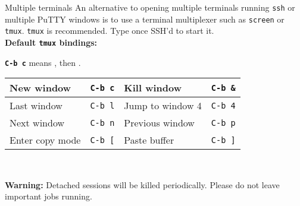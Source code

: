 \begin{block}{Multiple terminals}
  An alternative to opening multiple terminals running \texttt{ssh} or multiple PuTTY windows is to use a terminal multiplexer such as \texttt{screen} or \texttt{tmux}. \texttt{tmux} is recommended. Type  once SSH'd to start it. \\[0.7em]
  \textbf{Default \texttt{tmux} bindings:} \\
  {\newcommand{\key}[1]{\texttt{C-b #1}}
    \textbf{\key{c}} means , then .
    \begin{tabu} to 0.9\linewidth { X[2] X X[2] X }
      \hline
      New window & \key{c} & Kill window & \key{\&} \\ \hline
      Last window & \key{l} & Jump to window 4 & \key{4} \\ \hline
      Next window & \key{n} & Previous window & \key{p} \\ \hline
      Enter copy mode & \key{[} & Paste buffer & \key{]} \\ \hline
    \end{tabu} \\[1em]
  }
  \textbf{Warning:} Detached sessions will be killed periodically. Please do not leave important jobs running.

\end{block}
